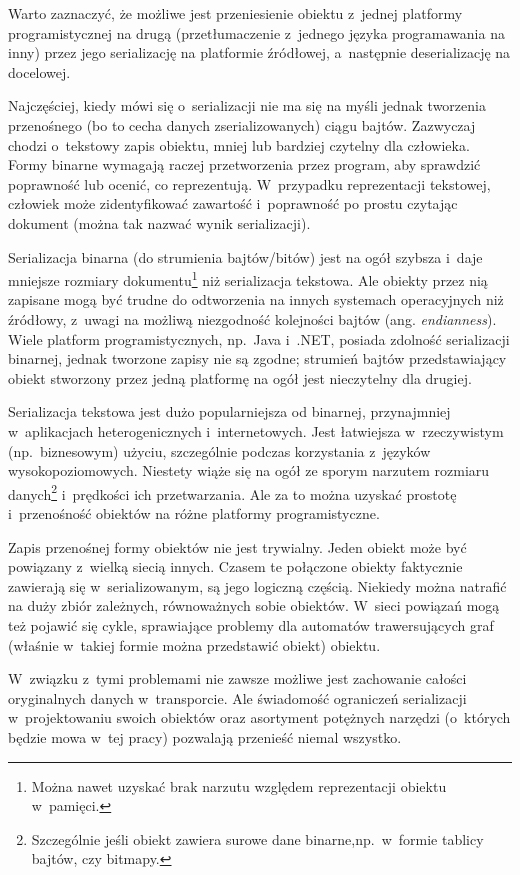 Warto zaznaczyć, że możliwe jest przeniesienie obiektu z~jednej platformy programistycznej na drugą (przetłumaczenie z~jednego języka programawania na inny) przez jego serializację na platformie źródłowej, a~następnie deserializację na docelowej.

Najczęściej, kiedy mówi się o~serializacji nie ma się na myśli jednak tworzenia przenośnego (bo to cecha danych zserializowanych) ciągu bajtów. Zazwyczaj chodzi o~tekstowy zapis obiektu, mniej lub bardziej czytelny dla człowieka. Formy binarne wymagają raczej przetworzenia przez program, aby sprawdzić poprawność lub ocenić, co reprezentują. W~przypadku reprezentacji tekstowej, człowiek może zidentyfikować zawartość i~poprawność po prostu czytając dokument (można tak nazwać wynik serializacji).

Serializacja binarna (do strumienia bajtów/bitów) jest na ogół szybsza i~daje mniejsze rozmiary dokumentu\footnote{Można nawet uzyskać brak narzutu względem reprezentacji obiektu w~pamięci.} niż serializacja tekstowa.
Ale obiekty przez nią zapisane mogą być trudne do odtworzenia na innych systemach operacyjnych niż źródłowy, z~uwagi na możliwą niezgodność kolejności bajtów (ang. \emph{endianness}). Wiele platform programistycznych, np.\ Java i~.NET, posiada zdolność serializacji binarnej, jednak tworzone zapisy nie są zgodne; strumień bajtów przedstawiający obiekt stworzony przez jedną platformę na ogół jest nieczytelny dla drugiej.

Serializacja tekstowa jest dużo popularniejsza od binarnej, przynajmniej w~aplikacjach heterogenicznych i~internetowych. Jest łatwiejsza w~rzeczywistym (np.\ biznesowym) użyciu, szczególnie podczas korzystania z~języków wysokopoziomowych.
Niestety wiąże się na ogół ze sporym narzutem rozmiaru danych\footnote{Szczególnie jeśli obiekt zawiera surowe dane binarne,np.\ w~formie tablicy bajtów, czy bitmapy.} i~prędkości ich przetwarzania.
Ale za to można uzyskać prostotę i~przenośność obiektów na różne platformy programistyczne.

Zapis przenośnej formy obiektów nie jest trywialny. Jeden obiekt może być powiązany z~wielką siecią innych. Czasem te połączone obiekty faktycznie zawierają się w~serializowanym, są jego logiczną częścią. Niekiedy można natrafić na duży zbiór zależnych, równoważnych sobie obiektów. W~sieci powiązań mogą też pojawić się cykle, sprawiające problemy dla automatów trawersujących graf (właśnie w~takiej formie można przedstawić obiekt) obiektu.

W~związku z~tymi problemami nie zawsze możliwe jest zachowanie całości oryginalnych danych w~transporcie.
Ale świadomość ograniczeń serializacji w~projektowaniu swoich obiektów oraz asortyment potężnych narzędzi (o~których będzie mowa w~tej pracy) pozwalają przenieść niemal wszystko.

